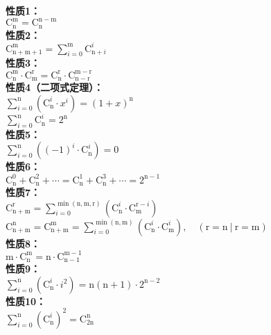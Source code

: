 \textbf{性质1：}\\[8pt]
{\large $\mathrm{C}_{\mathrm{n}}^{\mathrm{m}} = \mathrm{C}_{\mathrm{n}}^{\mathrm{n} - \mathrm{m}}$}\\[12pt]
\textbf{性质2：}\\[8pt]
{\large $\mathrm{C}_{\mathrm{n} + \mathrm{m} + 1}^{\mathrm{m}} = \sum_{i = 0}^{\mathrm{m}} \mathrm{C}_{\mathrm{n} + i}^{i}$}\\[12pt]
\textbf{性质3：}\\[8pt]
{\large $\mathrm{C}_{\mathrm{n}}^{\mathrm{m}} \cdot \mathrm{C}_{\mathrm{m}}^{\mathrm{r}} = \mathrm{C}_{\mathrm{n}}^{\mathrm{r}} \cdot \mathrm{C}_{\mathrm{n} - \mathrm{r}}^{\mathrm{m} - \mathrm{r}}$}\\[12pt]
\textbf{性质4（二项式定理）：}\\[8pt]
{\large $\sum_{i = 0}^{\mathrm{n}} \left( \mathrm{C}_{\mathrm{n}}^{i} \cdot x^{i} \right) = (1 + x)^{\mathrm{n}}$}\\[12pt]
{\large $\sum_{i = 0}^{\mathrm{n}} \mathrm{C}_{\mathrm{n}}^{i} = 2^{\mathrm{n}}$}\\[12pt]
\textbf{性质5：}\\[8pt]
{\large $\sum_{i = 0}^{\mathrm{n}} \left( (-1)^{i} \cdot \mathrm{C}_{\mathrm{n}}^{i} \right) = 0$}\\[12pt]
\textbf{性质6：}\\[8pt]
{\large $\mathrm{C}_{\mathrm{n}}^{0} + \mathrm{C}_{\mathrm{n}}^{2} + \cdots = \mathrm{C}_{\mathrm{n}}^{1} + \mathrm{C}_{\mathrm{n}}^{3} + \cdots = 2^{\mathrm{n} - 1}$}\\[12pt]
\textbf{性质7：}\\[8pt]
{\large $\mathrm{C}_{\mathrm{n} + \mathrm{m}}^{\mathrm{r}} = \sum_{i = 0}^{\min(\mathrm{n}, \mathrm{m}, \mathrm{r})} \left( \mathrm{C}_{\mathrm{n}}^{i} \cdot \mathrm{C}_{\mathrm{m}}^{\mathrm{r} - i} \right)$}\\[12pt]
{\large $\mathrm{C}_{\mathrm{n} + \mathrm{m}}^{\mathrm{n}} = \mathrm{C}_{\mathrm{n} + \mathrm{m}}^{\mathrm{m}} = \sum_{i = 0}^{\min(\mathrm{n}, \mathrm{m})} \left( \mathrm{C}_{\mathrm{n}}^{i} \cdot \mathrm{C}_{\mathrm{m}}^{i} \right), \quad (\mathrm{r} = \mathrm{n}\ |\ \mathrm{r} = \mathrm{m})$}\\[12pt]
\textbf{性质8：}\\[8pt]
{\large $\mathrm{m} \cdot \mathrm{C}_{\mathrm{n}}^{\mathrm{m}} = \mathrm{n} \cdot \mathrm{C}_{\mathrm{n} - 1}^{\mathrm{m} - 1}$}\\[12pt]
\textbf{性质9：}\\[8pt]
{\large $\sum_{i = 0}^{\mathrm{n}} \left( \mathrm{C}_{\mathrm{n}}^{i} \cdot i^2 \right) = \mathrm{n}(\mathrm{n} + 1) \cdot 2^{\mathrm{n} - 2}$}\\[12pt]
\textbf{性质10：}\\[8pt]
{\large $\sum_{i = 0}^{\mathrm{n}} \left( \mathrm{C}_{\mathrm{n}}^{i} \right)^2 = \mathrm{C}_{2\mathrm{n}}^{\mathrm{n}}$}\\[12pt]